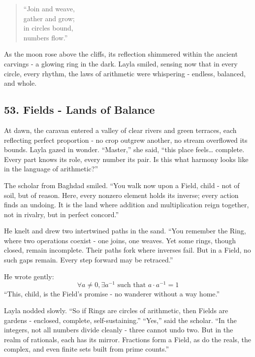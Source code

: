 \documentclass[
  letterpaper,
  DIV=11,
  numbers=noendperiod]{scrreprt}
\begin{document}
\begin{quote}
``Join and weave,\\
gather and grow;\\
in circles bound,\\
numbers flow.''
\end{quote}

As the moon rose above the cliffs, its reflection shimmered within the
ancient carvings - a glowing ring in the dark. Layla smiled, sensing now
that in every circle, every rhythm, the laws of arithmetic were
whispering - endless, balanced, and whole.

\subsection{53. Fields - Lands of
Balance}\label{fields---lands-of-balance}

At dawn, the caravan entered a valley of clear rivers and green
terraces, each reflecting perfect proportion - no crop outgrew another,
no stream overflowed its bounds. Layla gazed in wonder. ``Master,'' she
said, ``this place feels\ldots{} complete. Every part knows its role,
every number its pair. Is this what harmony looks like in the language
of arithmetic?''

The scholar from Baghdad smiled. ``You walk now upon a Field, child -
not of soil, but of reason. Here, every nonzero element holds its
inverse; every action finds an undoing. It is the land where addition
and multiplication reign together, not in rivalry, but in perfect
concord.''

He knelt and drew two intertwined paths in the sand. ``You remember the
Ring, where two operations coexist - one joins, one weaves. Yet some
rings, though closed, remain incomplete. Their paths fork where inverses
fail. But in a Field, no such gaps remain. Every step forward may be
retraced.''

He wrote gently: \[
\forall a \neq 0, \exists a^{-1} \text{ such that } a \cdot a^{-1} = 1
\] ``This, child, is the Field's promise - no wanderer without a way
home.''

Layla nodded slowly. ``So if Rings are circles of arithmetic, then
Fields are gardens - enclosed, complete, self-sustaining.'' ``Yes,''
said the scholar. ``In the integers, not all numbers divide cleanly -
three cannot undo two. But in the realm of rationals, each has its
mirror. Fractions form a Field, as do the reals, the complex, and even
finite sets built from prime counts.''
\end{document}

